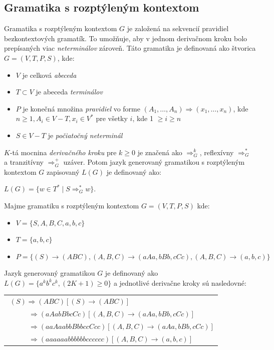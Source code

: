 \subsection{Gramatika s rozptýleným kontextom}
\label{gramkont}
Gramatika s rozptýleným kontextom $G$ je založená na sekvencií pravidiel bezkontextových gramatík. To umožňuje, aby v jednom derivačnom kroku bolo prepísaných viac \textit{neterminálov} zároveň. Táto gramatika je definovaná ako štvorica $G = (V, T, P, S)$, kde:
\begin{itemize}
\item $V$ je celková \textit{abeceda}
\item $T \subset V $ je abeceda \textit{terminálov}
\item $P$ je konečná množina \textit{pravidiel} vo forme $(A_1, \dots, A_n) \Rightarrow (x_1, \dots, x_n)$, kde $n \geq 1, A_i \in V - T, x_i \in V^\ast$ pre všetky $i$, kde 1 $\geq i \geq n$
\item $S \in V - T$ je \textit{počiatočný neterminál}
\end{itemize} 
$K$-tá mocnina \textit{derivačného kroku} pre $k \geq 0$ je značená ako $\Rightarrow^k_G$, reflexívny $\Rightarrow^\ast_G$ a tranzitívny $\Rightarrow^+_G$ uzáver. Potom jazyk generovaný gramatikou s rozptýleným kontextom $G$ zapisovaný $L(G)$ je definovaný ako: 
\begin{center}
$L(G) = \{w \in T^\ast \mid S \Rightarrow^\ast_G w\}$.
\end{center}
\begin{flushleft}
\begin{theorem}
\normalfont Majme gramatiku s rozptýleným kontextom $G = (V, T, P, S)$ kde: 
\begin{itemize}
\item $V = \{S, A, B, C, a, b, c\}$
\item $T = \{a, b, c\}$
\item $P =\{ (S) \to (ABC), (A, B, C) \to (aAa, bBb, cCc), (A, B, C) \to (a, b, c)\}$
\end{itemize} 
\end{theorem}
\end{flushleft}
Jazyk generovaný gramatikou $G$ je definovaný ako $L(G) = \{a^kb^kc^k, (2K + 1) \geq 0\}$ a jednotlivé derivačne kroky sú nasledovné: 
\begin{center}
\begin{tabular}{p{30em}} 
\quad\,\,$(S) \Rightarrow (ABC) [ (S) \to (ABC) ]$\\
\item $ \quad\quad\quad \Rightarrow (aAabBbcCc) [ (A, B, C) \to (aAa, bBb, cCc)]$\\
\item $ \quad\quad\quad \Rightarrow (aaAaabbBbbccCcc) [ (A, B, C) \to (aAa, bBb, cCc)]$\\
\item$ \quad\quad\quad \Rightarrow (aaaaaabbbbbbcccccc) [ (A, B, C) \to (a, b, c)]$
\end{tabular}
\end{center}




